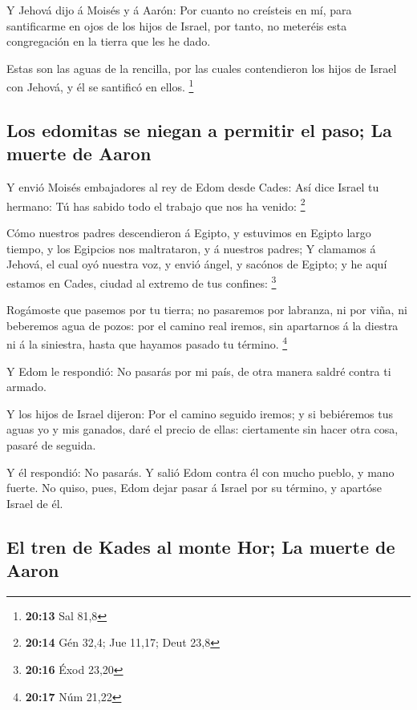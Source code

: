  Y Jehová dijo á Moisés y á Aarón: Por cuanto no creísteis
en mí, para santificarme en ojos de los hijos de Israel, por tanto, no
meteréis esta congregación en la tierra que les he dado.

 Estas son las aguas de la rencilla, por las cuales
contendieron los hijos de Israel con Jehová, y él se santificó en ellos.
\footnote{\textbf{20:13} Sal 81,8}

\hypertarget{los-edomitas-se-niegan-a-permitir-el-paso-la-muerte-de-aaron}{%
\subsection{Los edomitas se niegan a permitir el paso; La muerte de
Aaron}\label{los-edomitas-se-niegan-a-permitir-el-paso-la-muerte-de-aaron}}

 Y envió Moisés embajadores al rey de Edom desde Cades: Así
dice Israel tu hermano: Tú has sabido todo el trabajo que nos ha venido:
\footnote{\textbf{20:14} Gén 32,4; Jue 11,17; Deut 23,8}

 Cómo nuestros padres descendieron á Egipto, y estuvimos en
Egipto largo tiempo, y los Egipcios nos maltrataron, y á nuestros
padres;  Y clamamos á Jehová, el cual oyó nuestra voz, y
envió ángel, y sacónos de Egipto; y he aquí estamos en Cades, ciudad al
extremo de tus confines: \footnote{\textbf{20:16} Éxod 23,20}

 Rogámoste que pasemos por tu tierra; no pasaremos por
labranza, ni por viña, ni beberemos agua de pozos: por el camino real
iremos, sin apartarnos á la diestra ni á la siniestra, hasta que hayamos
pasado tu término. \footnote{\textbf{20:17} Núm 21,22}

 Y Edom le respondió: No pasarás por mi país, de otra
manera saldré contra ti armado.

 Y los hijos de Israel dijeron: Por el camino seguido
iremos; y si bebiéremos tus aguas yo y mis ganados, daré el precio de
ellas: ciertamente sin hacer otra cosa, pasaré de seguida.

 Y él respondió: No pasarás. Y salió Edom contra él con
mucho pueblo, y mano fuerte.  No quiso, pues, Edom dejar
pasar á Israel por su término, y apartóse Israel de él.

\hypertarget{el-tren-de-kades-al-monte-hor-la-muerte-de-aaron}{%
\subsection{El tren de Kades al monte Hor; La muerte de
Aaron}\label{el-tren-de-kades-al-monte-hor-la-muerte-de-aaron}}

